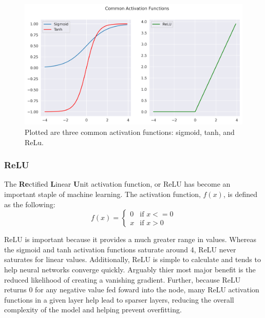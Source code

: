 \begin{figure}[h!]
    \centering
    \includegraphics[width=\linewidth]{Chapters/Figures/sigmoids.png}
    \caption[Activation-Functions]{Plotted are three common activation functions: sigmoid, tanh, and ReLu.}
    \label{fig:ActivationFunctions}
\end{figure}

\subsubsection{ReLU}
The \textbf{Re}ctified \textbf{L}inear \textbf{U}nit activation function, or ReLU has become an important staple of machine learning. The activation function, $ f(x) $, is defined as the following:
\begin{equation}
f(x)=
\begin{cases}
    0 & \text{if } x <= 0 \\
    x & \text{if } x > 0
\end{cases}
\end{equation}

\noindent ReLU is important because it provides a much greater range in values. Whereas the sigmoid and tanh activation functions saturate around 4, ReLU never saturates for linear values. Additionally, ReLU is simple to calculate and tends to help neural networks converge quickly. Arguably thier most major benefit is the reduced likelihood of creating a vanishing gradient. Further, because ReLU returns 0 for any negative value fed foward into the node, many ReLU activation functions in a given layer help lead to sparser layers, reducing the overall complexity of the model and helping prevent overfitting.


